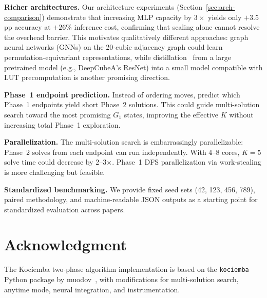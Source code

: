\documentclass[conference]{IEEEtran}
\begin{document}
\textbf{Richer architectures.}
Our architecture experiments (Section~\ref{sec:arch-comparison}) demonstrate that increasing MLP capacity by $3{\times}$ yields only $+3.5$ pp accuracy at $+26$\% inference cost, confirming that scaling alone cannot resolve the overhead barrier. This motivates qualitatively different approaches: graph neural networks (GNNs) on the 20-cubie adjacency graph could learn permutation-equivariant representations, while distillation~\cite{hinton2015} from a large pretrained model (e.g., DeepCubeA's ResNet) into a small model compatible with LUT precomputation is another promising direction.

\textbf{Phase~1 endpoint prediction.}
Instead of ordering moves, predict which Phase~1 endpoints yield short Phase~2 solutions. This could guide multi-solution search toward the most promising $G_1$ states, improving the effective $K$ without increasing total Phase~1 exploration.

\textbf{Parallelization.}
The multi-solution search is embarrassingly parallelizable: Phase~2 solves from each endpoint can run independently. With 4--8 cores, $K{=}5$ solve time could decrease by 2--3$\times$. Phase~1 DFS parallelization via work-stealing is more challenging but feasible.

\textbf{Standardized benchmarking.}
We provide fixed seed sets (42, 123, 456, 789), paired methodology, and machine-readable JSON outputs as a starting point for standardized evaluation across papers.

\section*{Acknowledgment}

The Kociemba two-phase algorithm implementation is based on the \texttt{kociemba} Python package by muodov~\cite{muodov}, with modifications for multi-solution search, anytime mode, neural integration, and instrumentation.
\end{document}
